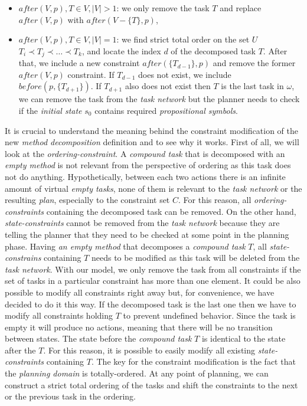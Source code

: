 \begin{itemize}
\begin{itemize}
            \item $after(V, p), T \in V, |V| > 1$: we only remove the task $T$ and replace $after(V, p)$ with $after(V - \{ T \}, p)$,

            \item $after(V, p), T \in V, |V| = 1$: we find strict total order on the set $U$ $T_i \prec T_j \prec \dots \prec T_k$, and locate the index $d$ of the decomposed task $T$. After that, we include a new constraint $after(\{ T_{d-1} \}, p)$ and remove the former $after(V, p)$ constraint. If $T_{d-1}$ does not exist, we include $before(p, \{ T_{d+1} \})$. If $T_{d+1}$ also does not exist then $T$ is the last task in $\omega$, we can remove the task from the \emph{task network} but the planner needs to check if the \emph{initial state} $s_0$ contains required \emph{propositional symbols}.
        \end{itemize}
\end{itemize}

\medskip\noindent
It is crucial to understand the meaning behind the constraint modification of the new \emph{method decomposition} definition and to see why it works. First of all, we will look at the \emph{ordering-constraint}. A \emph{compound task} that is decomposed with an \emph{empty method} is not relevant from the perspective of ordering as this task does not do anything. Hypothetically, between each two actions there is an infinite amount of virtual \emph{empty tasks}, none of them is relevant to the \emph{task network} or the resulting \emph{plan}, especially to the constraint set $C$. For this reason, all \emph{ordering-constraints} containing the decomposed task can be removed. On the other hand, \emph{state-constraints} cannot be removed from the \emph{task network} because they are telling the planner that they need to be checked at some point in the planning phase. Having \emph{an empty method} that decomposes a \emph{compound task} $T$, all \emph{state-constrains} containing $T$ needs to be modified as this task will be deleted from the \emph{task network}. With our model, we only remove the task from all constraints if the set of tasks in a particular constraint has more than one element. It could be also possible to modify all constraints right away but, for convenience, we have decided to do it this way. If the decomposed task is the last one then we have to modify all constraints holding $T$ to prevent undefined behavior. Since the task is empty it will produce no actions, meaning that there will be no transition between states. The state before the \emph{compound task} $T$ is identical to the state after the $T$. For this reason, it is possible to easily modify all existing \emph{state-constraints} containing $T$. The key for the constraint modification is the fact that the \emph{planning domain} is totally-ordered. At any point of planning, we can construct a strict total ordering of the tasks and shift the constraints to the next or the previous task in the ordering.

